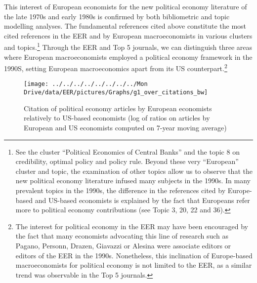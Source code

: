 \documentclass[
  12pt,
  onecolumn]{article}
\begin{document}
This interest of European economists for the new political economy literature of the late 1970s and early 1980s is confirmed by both bibliometric and topic modelling analyses. The fundamental references cited above constitute the most cited references in the EER and by European macroeconomists in various clusters and topics.\footnote{See the cluster ``Political Economics of Central Banks'' and the topic 8 on credibility, optimal policy and policy rule. Beyond these very ``European'' cluster and topic, the examination of other topics allow us to observe that the new political economy literature infused many subjects in the 1990s. In many prevalent topics in the 1990s, the difference in the references cited by Europe-based and US-based economists is explained by the fact that Europeans refer more to political economy contributions (see Topic 3, 20, 22 and 36).} Through the EER and Top 5 journals, we can distinguish three areas where European macroeconomists employed a political economy framework in the 1990S, setting European macroeconomics apart from its US counterpart.\footnote{The interest for political economy in the EER may have been encouraged by the fact that many economists advocating this line of research such as Pagano, Personn, Drazen, Giavazzi or Alesina were associate editors or editors of the EER in the 1990s. Nonetheless, this inclination of Europe-based macroeconomists for political economy is not limited to the EER, as a similar trend was observable in the Top 5 journals.}

\begin{figure}[H]

{\centering \texttt{[image: ../../../../../../../../Mon Drive/data/EER/pictures/Graphs/g1\_over\_citations\_bw]} 

}

\caption{Citation of political economy articles by European economists relatively to US-based economists (log of ratios on articles by European and US economists computed on 7-year moving average)}\label{fig:plot-political-economy-europe}
\end{figure}
\end{document}
